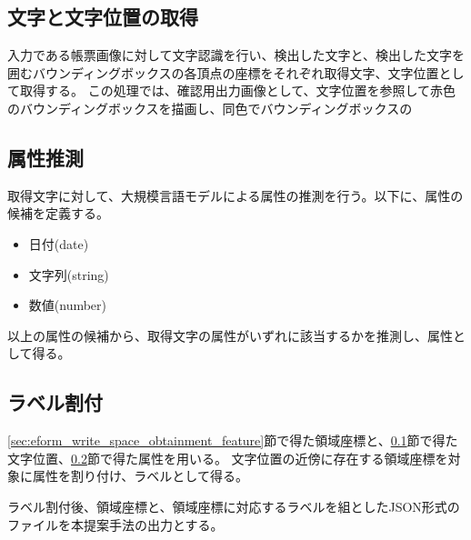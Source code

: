 \subsection{文字と文字位置の取得}\label{subsec:char_and_bbox_obtainment}
入力である帳票画像に対して文字認識を行い、検出した文字と、検出した文字を囲むバウンディングボックスの各頂点の座標をそれぞれ取得文字、文字位置として取得する。
この処理では、確認用出力画像として、文字位置を参照して赤色のバウンディングボックスを描画し、同色でバウンディングボックスの

\subsection{属性推測}\label{subsec:att_prediction}
取得文字に対して、大規模言語モデルによる属性の推測を行う。以下に、属性の候補を定義する。

\begin{itemize}
	\item 日付(date)
	\item 文字列(string)
	\item 数値(number)
\end{itemize}

以上の属性の候補から、取得文字の属性がいずれに該当するかを推測し、属性として得る。

\subsection{ラベル割付}\label{subsec:label_link}
\ref{sec:eform_write_space_obtainment_feature}節で得た領域座標と、\ref{subsec:char_and_bbox_obtainment}節で得た文字位置、\ref{subsec:att_prediction}節で得た属性を用いる。
文字位置の近傍に存在する領域座標を対象に属性を割り付け、ラベルとして得る。

ラベル割付後、領域座標と、領域座標に対応するラベルを組としたJSON形式のファイルを本提案手法の出力とする。
